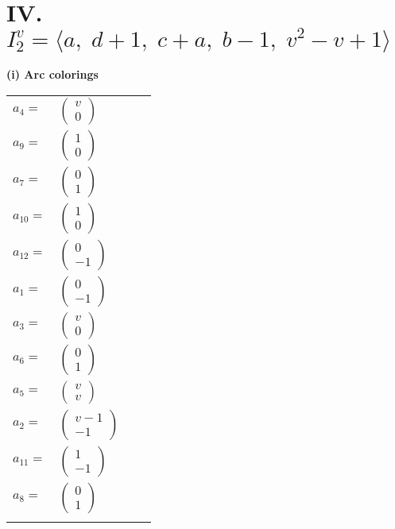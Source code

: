 \documentclass[1p]{elsarticle_modified}
\theoremstyle{definition}
\begin{document}
\centering \section*{IV. $I^v_{2}= \langle a,\;d+1,\;c+a,\;b-1,\;v^2- v+1 \rangle$}
\flushleft \textbf{(i) Arc colorings}\\
\begin{tabular}{m{7pt} m{180pt} m{7pt} m{180pt} }
\flushright $a_{4}=$&$\begin{pmatrix}v\\0\end{pmatrix}$ \\
\flushright $a_{9}=$&$\begin{pmatrix}1\\0\end{pmatrix}$ \\
\flushright $a_{7}=$&$\begin{pmatrix}0\\1\end{pmatrix}$ \\
\flushright $a_{10}=$&$\begin{pmatrix}1\\0\end{pmatrix}$ \\
\flushright $a_{12}=$&$\begin{pmatrix}0\\-1\end{pmatrix}$ \\
\flushright $a_{1}=$&$\begin{pmatrix}0\\-1\end{pmatrix}$ \\
\flushright $a_{3}=$&$\begin{pmatrix}v\\0\end{pmatrix}$ \\
\flushright $a_{6}=$&$\begin{pmatrix}0\\1\end{pmatrix}$ \\
\flushright $a_{5}=$&$\begin{pmatrix}v\\v\end{pmatrix}$ \\
\flushright $a_{2}=$&$\begin{pmatrix}v-1\\-1\end{pmatrix}$ \\
\flushright $a_{11}=$&$\begin{pmatrix}1\\-1\end{pmatrix}$ \\
\flushright $a_{8}=$&$\begin{pmatrix}0\\1\end{pmatrix}$\\&\end{tabular}
\end{document}
